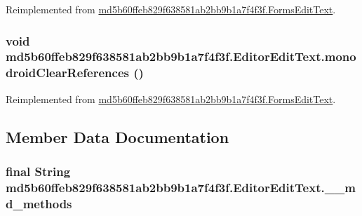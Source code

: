 Reimplemented from \hyperlink{classmd5b60ffeb829f638581ab2bb9b1a7f4f3f_1_1_forms_edit_text_abff92edb59e12022a3bad902cad5b3c}{md5b60ffeb829f638581ab2bb9b1a7f4f3f.FormsEditText}.\hypertarget{classmd5b60ffeb829f638581ab2bb9b1a7f4f3f_1_1_editor_edit_text_acf56440a58971488b7292ee85983d77}{
\subsubsection[{monodroidClearReferences}]{\setlength{\rightskip}{0pt plus 5cm}void md5b60ffeb829f638581ab2bb9b1a7f4f3f.EditorEditText.monodroidClearReferences ()}}
\label{classmd5b60ffeb829f638581ab2bb9b1a7f4f3f_1_1_editor_edit_text_acf56440a58971488b7292ee85983d77}




Reimplemented from \hyperlink{classmd5b60ffeb829f638581ab2bb9b1a7f4f3f_1_1_forms_edit_text_842c9f28b9164b840f11c15e502397ff}{md5b60ffeb829f638581ab2bb9b1a7f4f3f.FormsEditText}.

\subsection{Member Data Documentation}
\hypertarget{classmd5b60ffeb829f638581ab2bb9b1a7f4f3f_1_1_editor_edit_text_c38db1db19f69806cc1b75f1a04cebda}{
\subsubsection[{\_\-\_\-md\_\-methods}]{\setlength{\rightskip}{0pt plus 5cm}final String {\bf md5b60ffeb829f638581ab2bb9b1a7f4f3f.EditorEditText.\_\-\_\-md\_\-methods}}}
\label{classmd5b60ffeb829f638581ab2bb9b1a7f4f3f_1_1_editor_edit_text_c38db1db19f69806cc1b75f1a04cebda}




